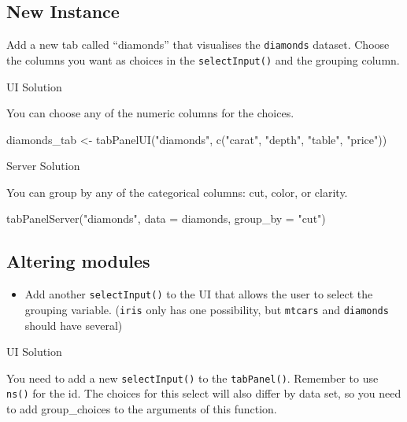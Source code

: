 \documentclass[
  oneside]{book}
\newenvironment{Shaded}{\begin{snugshade}}{\end{snugshade}}
\newcommand{\AttributeTok}[1]{\textcolor[rgb]{0.77,0.63,0.00}{#1}}
\newcommand{\FunctionTok}[1]{\textcolor[rgb]{0.00,0.00,0.00}{#1}}
\newcommand{\NormalTok}[1]{#1}
\newcommand{\OtherTok}[1]{\textcolor[rgb]{0.56,0.35,0.01}{#1}}
\newcommand{\StringTok}[1]{\textcolor[rgb]{0.31,0.60,0.02}{#1}}
\providecommand{\tightlist}{%
  \setlength{\itemsep}{0pt}\setlength{\parskip}{0pt}}
\begin{document}
\hypertarget{new-instance}{%
\subsection{New Instance}\label{new-instance}}

Add a new tab called ``diamonds'' that visualises the \texttt{diamonds} dataset. Choose the columns you want as choices in the \texttt{selectInput}\texttt{()} and the grouping column.

UI Solution

You can choose any of the numeric columns for the choices.

\begin{Shaded}
\begin{Highlighting}[]
\NormalTok{diamonds\_tab }\OtherTok{\textless{}{-}} \FunctionTok{tabPanelUI}\NormalTok{(}\StringTok{"diamonds"}\NormalTok{, }\FunctionTok{c}\NormalTok{(}\StringTok{"carat"}\NormalTok{, }\StringTok{"depth"}\NormalTok{, }\StringTok{"table"}\NormalTok{, }\StringTok{"price"}\NormalTok{))}
\end{Highlighting}
\end{Shaded}

Server Solution

You can group by any of the categorical columns: cut, color, or clarity.

\begin{Shaded}
\begin{Highlighting}[]
\FunctionTok{tabPanelServer}\NormalTok{(}\StringTok{"diamonds"}\NormalTok{, }\AttributeTok{data =}\NormalTok{ diamonds, }\AttributeTok{group\_by =} \StringTok{"cut"}\NormalTok{)}
\end{Highlighting}
\end{Shaded}

\hypertarget{altering-modules}{%
\subsection{Altering modules}\label{altering-modules}}

\begin{itemize}
\tightlist
\item
  Add another \texttt{selectInput}\texttt{()} to the UI that allows the user to select the grouping variable. (\texttt{iris} only has one possibility, but \texttt{mtcars} and \texttt{diamonds} should have several)
\end{itemize}

UI Solution

You need to add a new \texttt{selectInput}\texttt{()} to the \texttt{tabPanel}\texttt{()}. Remember to use \texttt{ns}\texttt{()} for the id. The choices for this select will also differ by data set, so you need to add \AttributeTok{group\_choices} to the arguments of this function.
\end{document}
